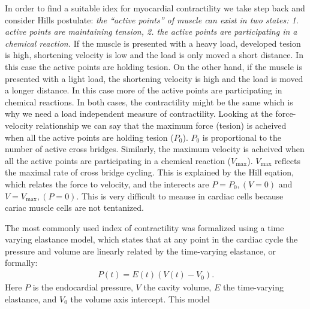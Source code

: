 In order to find a suitable idex for myocardial contractility we take
step back and consider Hills postulate: \emph{the ``active points'' of
  muscle can exist in two states: 1. active points are maintaining
  tension, 2. the active points are participating in a chemical
  reaction.} 
If the muscle is presented with a heavy load, developed tesion is
high, shortening velocity is low and the load is only moved a short
distance. In this case the active points are holding tesion.
On the other hand, if the muscle is presented with a light load, the
shortening velocity is high and the load is moved a longer
distance. In this case more of the active points are participating in
chemical reactions. 
In both cases, the contractility might be the same which is why we
need a load independent measure of contractility.
Looking at the force-velocity relationship we can say that the maximum
force (tesion) is acheived when all the active points are holding
tesion ($P_0$). $P_0$ is proportional to the number of active
cross bridges.
Similarly, the maximum velocity is acheived when all
the active points are participating in a chemical reaction
($V_{\text{max}}$). $V_{\text{max}}$ reflects the maximal rate of
cross bridge cycling. 
This is explained by the Hill eqation, which
relates the force to velocity, and the interects are $P = P_0, (V = 0)$
and $V = V_{\text{max}}, (P = 0)$. This is very difficult to meause in
cardiac cells because cariac muscle cells are not tentanized.

The most commonly used index of contractility was formalized
\cite{sagawa1977end} using a time varying elastance model, which
states that at any point in the cardiac cycle the pressure and volume
are linearly related by the time-varying elastance, or formally:
\begin{align}
  P(t) = E(t)( V(t) - V_0 ).
  \label{eq:time_varying_elastance}
\end{align}
Here $P$ is the endocardial pressure, $V$ the cavity volume, $E$ the
time-varying elastance, and $V_0$ the volume axis intercept. This
model  


